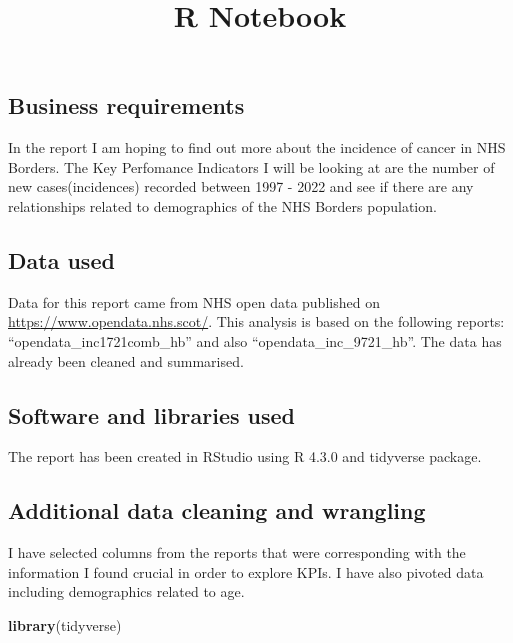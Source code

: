 \documentclass[
]{article}
\title{R Notebook}
\author{}
\date{\vspace{-2.5em}}
\newenvironment{Shaded}{\begin{snugshade}}{\end{snugshade}}
\newcommand{\FunctionTok}[1]{\textcolor[rgb]{0.13,0.29,0.53}{\textbf{#1}}}
\newcommand{\NormalTok}[1]{#1}
\begin{document}
\maketitle

\hypertarget{business-requirements}{%
\subsection{Business requirements}\label{business-requirements}}

In the report I am hoping to find out more about the incidence of cancer
in NHS Borders. The Key Perfomance Indicators I will be looking at are
the number of new cases(incidences) recorded between 1997 - 2022 and see
if there are any relationships related to demographics of the NHS
Borders population.

\hypertarget{data-used}{%
\subsection{Data used}\label{data-used}}

Data for this report came from NHS open data published on
\url{https://www.opendata.nhs.scot/}. This analysis is based on the
following reports: ``opendata\_inc1721comb\_hb'' and also
``opendata\_inc\_9721\_hb''. The data has already been cleaned and
summarised.

\hypertarget{software-and-libraries-used}{%
\subsection{Software and libraries
used}\label{software-and-libraries-used}}

The report has been created in RStudio using R 4.3.0 and tidyverse
package.

\hypertarget{additional-data-cleaning-and-wrangling}{%
\subsection{Additional data cleaning and
wrangling}\label{additional-data-cleaning-and-wrangling}}

I have selected columns from the reports that were corresponding with
the information I found crucial in order to explore KPIs. I have also
pivoted data including demographics related to age.

\begin{Shaded}
\begin{Highlighting}[]
\FunctionTok{library}\NormalTok{(tidyverse)}
\end{Highlighting}
\end{Shaded}
\end{document}

